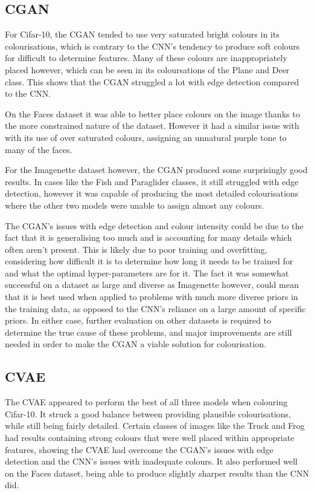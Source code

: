 \documentclass{l4proj}
\begin{document}
\subsection{CGAN}

For Cifar-10, the CGAN tended to use very saturated bright colours in its colourisations, which is contrary to the CNN's tendency to produce soft colours for difficult to determine features. Many of these colours are inappropriately placed however, which can be seen in its coloursations of the Plane and Deer class. This shows that the CGAN struggled a lot with edge detection compared to the CNN. 

On the Faces dataset it was able to better place colours on the image thanks to the more constrained nature of the dataset. However it had a similar issue with with its use of over saturated colours, assigning an unnatural purple tone to many of the faces.

For the Imagenette dataset however, the CGAN produced some surprisingly good results. In cases like the Fish and Paraglider classes, it still struggled with edge detection, however it was capable of producing the most detailed colourisations where the other two models were unable to assign almost any colours. 

The CGAN's issues with edge detection and colour intensity could be due to the fact that it is generalising too much and is accounting for many details which often aren't present. This is likely due to poor training and overfitting, considering how difficult it is to determine how long it needs to be trained for and what the optimal hyper-parameters are for it. The fact it was somewhat successful on a dataset as large and diverse as Imagenette however, could mean that it is best used when applied to problems with much more diverse priors in the training data, as opposed to the CNN's reliance on a large amount of specific priors. In either case, further evaluation on other datasets is required to determine the true cause of these problems, and major improvements are still needed in order to make the CGAN a viable solution for colourisation.

\subsection{CVAE}
\label{cvaediscussion}

The CVAE appeared to perform the best of all three models when colouring Cifar-10. It struck a good balance between providing plausible colourisations, while still being fairly detailed. Certain classes of images like the Truck and Frog had results containing strong colours that were well placed within appropriate features, showing the CVAE had overcome the CGAN's issues with edge detection and the CNN's issues with inadequate colours. It also performed well on the Faces dataset, being able to produce slightly sharper results than the CNN did.
\end{document}
